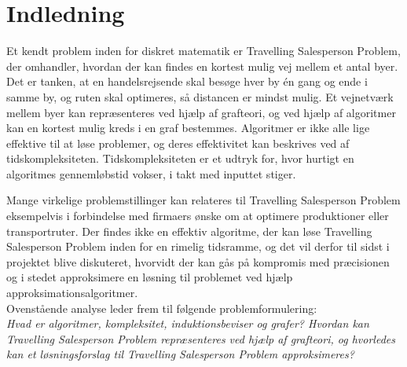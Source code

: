 \chapter{Indledning}
Et kendt problem inden for diskret matematik er Travelling Salesperson Problem, der omhandler, hvordan der kan findes en kortest mulig vej mellem et antal byer. 
Det er tanken, at en handelsrejsende skal besøge hver by én gang og ende i samme by, og ruten skal optimeres, så distancen er mindst mulig. 
Et vejnetværk mellem byer kan repræsenteres ved hjælp af grafteori, og ved hjælp af algoritmer kan en kortest mulig kreds i en graf bestemmes. 
Algoritmer er ikke alle lige effektive til at løse problemer, og deres effektivitet kan beskrives ved af tidskompleksiteten. 
Tidskompleksiteten er et udtryk for, hvor hurtigt en algoritmes gennemløbstid vokser, i takt med inputtet stiger. 

Mange virkelige problemstillinger kan relateres til Travelling Salesperson Problem eksempelvis i forbindelse med firmaers ønske om at optimere produktioner eller transportruter. 
Der findes ikke en effektiv algoritme, der kan løse Travelling Salesperson Problem inden for en rimelig tidsramme, og det vil derfor til sidst i projektet blive diskuteret, hvorvidt der kan gås på kompromis med præcisionen og i stedet approksimere en løsning til problemet ved hjælp approksimationsalgoritmer.
\\
Ovenstående analyse leder frem til følgende problemformulering:\\

\textit{Hvad er algoritmer, kompleksitet, induktionsbeviser og grafer? Hvordan kan Travelling Salesperson Problem repræsenteres ved hjælp af grafteori, og hvorledes kan et løsningsforslag til Travelling Salesperson Problem approksimeres?}
\\\\

